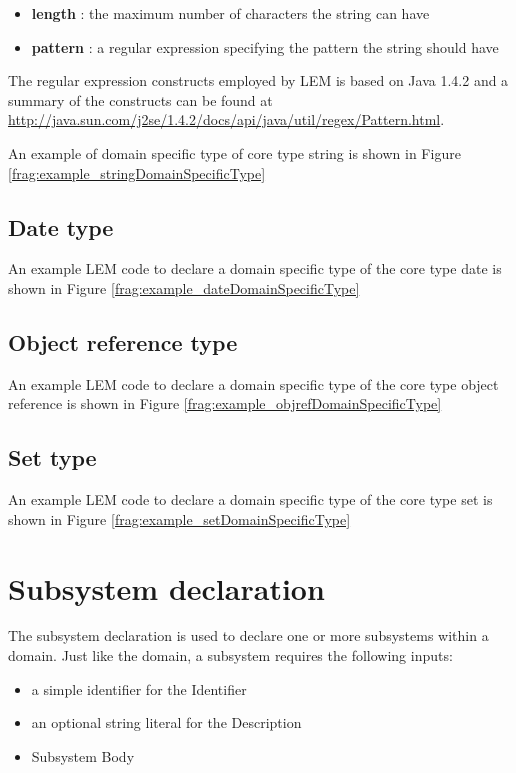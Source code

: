 \begin{itemize}
\item \textbf{length} : the maximum number of characters the string can have
\item \textbf{pattern} : a regular expression specifying the pattern the string should have
\end{itemize}

The regular expression constructs employed by LEM is based on Java 1.4.2 and a summary of the constructs can be found at \href{http://java.sun.com/j2se/1.4.2/docs/api/java/util/regex/Pattern.html}{http://java.sun.com/j2se/1.4.2/docs/api/java/util/regex/Pattern.html}.

An example of domain specific type of core type string is shown in Figure \ref{frag:example_stringDomainSpecificType}


\subsection{Date type}
An example LEM code to declare a domain specific type of the core type date is shown in Figure \ref{frag:example_dateDomainSpecificType}


\subsection{Object reference type}
An example LEM code to declare a domain specific type of the core type object reference is shown in Figure \ref{frag:example_objrefDomainSpecificType}


\subsection{Set type}
An example LEM code to declare a domain specific type of the core type set is shown in Figure \ref{frag:example_setDomainSpecificType}


\section{Subsystem declaration}\label{sec:subsystemDeclaration}
The subsystem declaration is used to declare one or more subsystems within a domain. Just like the domain, a subsystem requires the following inputs:
\begin{itemize}
\item a simple identifier for the Identifier
\item an optional string literal for the Description
\item Subsystem Body
\end{itemize}


